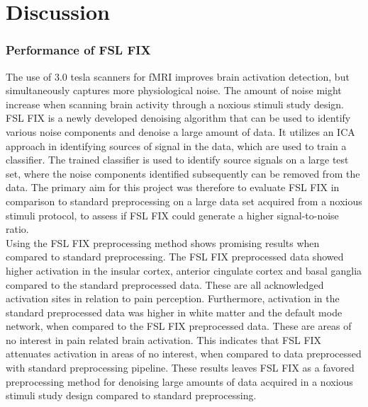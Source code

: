 \chapter{Discussion}
\subsection*{Performance of FSL FIX}
The use of 3.0 tesla scanners for fMRI improves brain activation detection, but simultaneously captures more physiological noise. The amount of noise might increase when scanning brain activity through a noxious stimuli study design. FSL FIX is a newly developed denoising algorithm that can be used to identify various noise components and denoise a large amount of data. It utilizes an ICA approach in identifying sources of signal in the data, which are used to train a classifier. The trained classifier is used to identify source signals on a large test set, where the noise components identified subsequently can be removed from the data. The primary aim for this project was therefore to evaluate FSL FIX in comparison to standard preprocessing on a large data set acquired from a noxious stimuli protocol, to assess if FSL FIX could generate a higher signal-to-noise ratio. \\
Using the FSL FIX preprocessing method shows promising results when compared to standard preprocessing. The FSL FIX preprocessed data showed higher activation in the insular cortex, anterior cingulate cortex and basal ganglia compared to the standard preprocessed data. These are all acknowledged activation sites in relation to pain perception. Furthermore, activation in the standard preprocessed data was higher in white matter and the default mode network, when compared to the FSL FIX preprocessed data. These are areas of no interest in pain related brain activation. This indicates that FSL FIX attenuates activation in areas of no interest, when compared to data preprocessed with standard preprocessing pipeline. These results leaves FSL FIX as a favored preprocessing method for denoising large amounts of data acquired in a noxious stimuli study design compared to standard preprocessing. 

